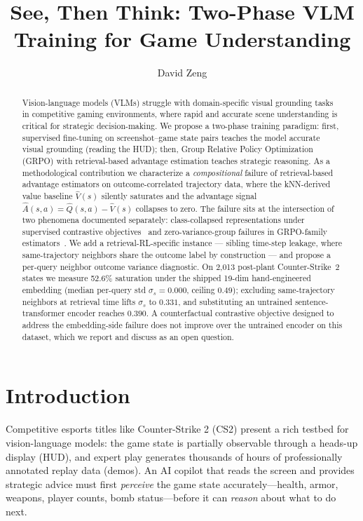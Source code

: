 \documentclass{article}
\title{See, Then Think: Two-Phase VLM Training for Game Understanding}
\author{
  David Zeng \\
}
\begin{document}
\maketitle

\begin{abstract}
Vision-language models (VLMs) struggle with domain-specific visual grounding tasks in competitive gaming environments, where rapid and accurate scene understanding is critical for strategic decision-making. We propose a two-phase training paradigm: first, supervised fine-tuning on screenshot--game state pairs teaches the model accurate visual grounding (reading the HUD); then, Group Relative Policy Optimization (GRPO) with retrieval-based advantage estimation teaches strategic reasoning. As a methodological contribution we characterize a \emph{compositional} failure of retrieval-based advantage estimators on outcome-correlated trajectory data, where the kNN-derived value baseline $\hat{V}(s)$ silently saturates and the advantage signal $\hat{A}(s,a) = \hat{Q}(s,a) - \hat{V}(s)$ collapses to zero. The failure sits at the intersection of two phenomena documented separately: class-collapsed representations under supervised contrastive objectives~\cite{graf2021dissecting} and zero-variance-group failures in GRPO-family estimators~\cite{zerovariance2025,ngrpo2025}. We add a retrieval-RL-specific instance --- sibling time-step leakage, where same-trajectory neighbors share the outcome label by construction --- and propose a per-query neighbor outcome variance diagnostic. On 2{,}013 post-plant Counter-Strike~2 states we measure 52.6\% saturation under the shipped 19-dim hand-engineered embedding (median per-query std $\sigma_s{=}0.000$, ceiling $0.49$); excluding same-trajectory neighbors at retrieval time lifts $\sigma_s$ to $0.331$, and substituting an untrained sentence-transformer encoder reaches $0.390$. A counterfactual contrastive objective designed to address the embedding-side failure does not improve over the untrained encoder on this dataset, which we report and discuss as an open question.
\end{abstract}

\section{Introduction}
\label{sec:intro}

Competitive esports titles like Counter-Strike 2 (CS2) present a rich testbed for vision-language models: the game state is partially observable through a heads-up display (HUD), and expert play generates thousands of hours of professionally annotated replay data (demos). An AI copilot that reads the screen and provides strategic advice must first \emph{perceive} the game state accurately---health, armor, weapons, player counts, bomb status---before it can \emph{reason} about what to do next.
\end{document}
